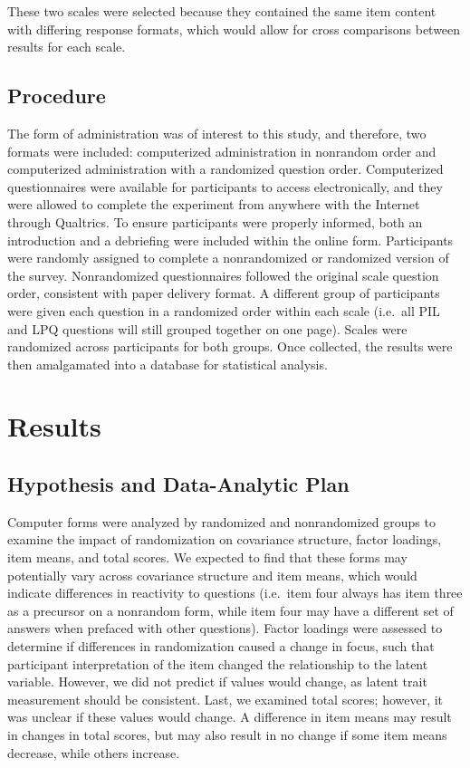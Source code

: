 \documentclass[english,man, mask]{apa6}
\theoremstyle{definition}
\theoremstyle{definition}
\theoremstyle{definition}
\theoremstyle{remark}
\begin{document}
These two scales were selected because they contained the same item
content with differing response formats, which would allow for cross
comparisons between results for each scale.

\subsection{Procedure}\label{procedure}

The form of administration was of interest to this study, and therefore,
two formats were included: computerized administration in nonrandom
order and computerized administration with a randomized question order.
Computerized questionnaires were available for participants to access
electronically, and they were allowed to complete the experiment from
anywhere with the Internet through Qualtrics. To ensure participants
were properly informed, both an introduction and a debriefing were
included within the online form. Participants were randomly assigned to
complete a nonrandomized or randomized version of the survey.
Nonrandomized questionnaires followed the original scale question order,
consistent with paper delivery format. A different group of participants
were given each question in a randomized order within each scale
(i.e.~all PIL and LPQ questions will still grouped together on one
page). Scales were randomized across participants for both groups. Once
collected, the results were then amalgamated into a database for
statistical analysis.

\section{Results}\label{results}

\subsection{Hypothesis and Data-Analytic
Plan}\label{hypothesis-and-data-analytic-plan}

Computer forms were analyzed by randomized and nonrandomized groups to
examine the impact of randomization on covariance structure, factor
loadings, item means, and total scores. We expected to find that these
forms may potentially vary across covariance structure and item means,
which would indicate differences in reactivity to questions (i.e.~item
four always has item three as a precursor on a nonrandom form, while
item four may have a different set of answers when prefaced with other
questions). Factor loadings were assessed to determine if differences in
randomization caused a change in focus, such that participant
interpretation of the item changed the relationship to the latent
variable. However, we did not predict if values would change, as latent
trait measurement should be consistent. Last, we examined total scores;
however, it was unclear if these values would change. A difference in
item means may result in changes in total scores, but may also result in
no change if some item means decrease, while others increase.
\end{document}
